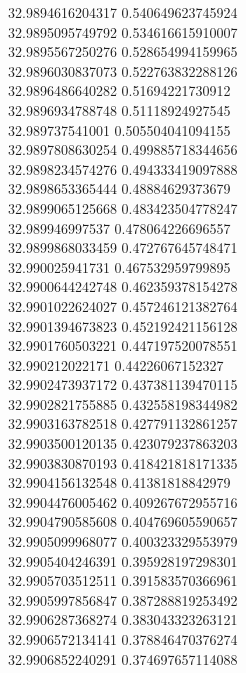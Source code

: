 {32.9894616204317	0.540649623745924\\
32.9895095749792	0.534616615910007\\
32.9895567250276	0.528654994159965\\
32.9896030837073	0.522763832288126\\
32.9896486640282	0.51694221730912\\
32.9896934788748	0.51118924927545\\
32.989737541001	0.505504041094155\\
32.9897808630254	0.499885718344656\\
32.9898234574276	0.494333419097888\\
32.9898653365444	0.48884629373679\\
32.9899065125668	0.483423504778247\\
32.989946997537	0.478064226696557\\
32.9899868033459	0.472767645748471\\
32.990025941731	0.467532959799895\\
32.9900644242748	0.462359378154278\\
32.9901022624027	0.457246121382764\\
32.9901394673823	0.452192421156128\\
32.9901760503221	0.447197520078551\\
32.990212022171	0.44226067152327\\
32.9902473937172	0.437381139470115\\
32.9902821755885	0.432558198344982\\
32.9903163782518	0.427791132861257\\
32.9903500120135	0.423079237863203\\
32.9903830870193	0.418421818171335\\
32.9904156132548	0.41381818842979\\
32.9904476005462	0.409267672955716\\
32.9904790585608	0.404769605590657\\
32.9905099968077	0.400323329553979\\
32.9905404246391	0.395928197298301\\
32.9905703512511	0.391583570366961\\
32.9905997856847	0.387288819253492\\
32.9906287368274	0.383043323263121\\
32.9906572134141	0.378846470376274\\
32.9906852240291	0.374697657114088\\
}
